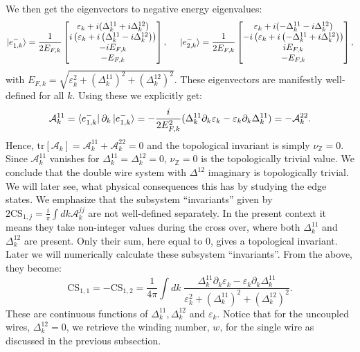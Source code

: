 We then get the eigenvectors to negative energy eigenvalues:
\begin{equation}
\ket{e^{-}_{1,k}} = \frac{1}{2E_{F,k}}\begin{bmatrix} \varepsilon_k + i(\Delta^{11}_k + i\Delta^{12}_k) \\ i\left(\varepsilon_k + i\left(\Delta^{11}_k - i\Delta^{12}_k\right)\right) \\ -iE_{F,k} \\ -E_{F,k} \end{bmatrix}, \hspace{0.5cm} \ket{e^{-}_{2,k}} = \frac{1}{2E_{F,k}}\begin{bmatrix} \varepsilon_k + i(-\Delta^{11}_k - i\Delta^{12}_k) \\ -i\left(\varepsilon_k + i\left(-\Delta^{11}_k + i\Delta^{12}_k\right)\right) \\ iE_{F,k} \\ -E_{F,k} \end{bmatrix},
\end{equation}
with $E_{F,k} = \sqrt{\varepsilon_k^2 + (\Delta^{11}_k)^2 + (\Delta^{12}_k)^2}$. These eigenvectors are manifestly well-defined for all $k$. Using these we explicitly get:
\begin{equation}
\mathcal{A}^{11}_k = \bra{e^{-}_{1,k}}\partial_k\ket{e^{-}_{1,k}} = -\frac{i}{2E_{F,k}^2}(\Delta^{11}_k\partial_k\varepsilon_k - \varepsilon_k\partial_k\Delta^{11}_k) = -\mathcal{A}^{22}_k. \nonumber
\end{equation}
Hence, $\text{tr}[\mathcal{A}_k] = \mathcal{A}^{11}_k  + \mathcal{A}^{22}_k = 0$ and the topological invariant is simply $\nu_{\mathbb{Z}} = 0$. Since $\mathcal{A}^{11}_k$ vanishes for $\Delta^{11}_k = \Delta^{12}_k = 0$, $\nu_{\mathbb{Z}} = 0$ is the topologically trivial value. We conclude that the double wire system with $\Delta^{12}$ imaginary is topologically trivial. We will later see, what physical consequences this has by studying the edge states. We emphasize that the subsystem ``invariants'' given by $2\text{CS}_{1,j} = \frac{i}{\pi}\int dk \mathcal{A}^{jj}_k$ are not well-defined separately. In the present context it means they take non-integer values during the cross over, where both $\Delta^{11}_k$ and $\Delta^{12}_k$ are present. Only their sum, here equal to $0$, gives a topological invariant. Later we will numerically calculate these subsystem ``invariants''. From the above, they become:
\begin{equation}
\text{CS}_{1,1} = - \text{CS}_{1,2} = \frac{1}{4\pi}\int dk \; \frac{\Delta^{11}_k\partial_k\varepsilon_k - \varepsilon_k\partial_k\Delta^{11}_k}{\varepsilon^2_k + (\Delta^{11}_k)^2 + (\Delta^{12}_k)^2}. 
\end{equation}
These are continuous functions of $\Delta^{11}_k, \Delta^{12}_k$ and $\varepsilon_k$. Notice that for the uncoupled wires, $\Delta^{12}_k = 0$, we retrieve the winding number, $w$, for the single wire as discussed in the previous subsection. 


